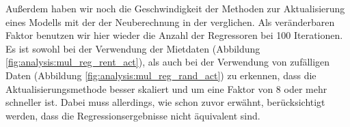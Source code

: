 Außerdem haben wir noch die Geschwindigkeit der Methoden zur Aktualisierung eines Modells mit der der Neuberechnung in der \naglib verglichen.
Als veränderbaren Faktor benutzen wir hier wieder die Anzahl der Regressoren bei 100 Iterationen.
Es ist sowohl bei der Verwendung der Mietdaten (Abbildung \ref{fig:analysis:mul_reg_rent_act}), als auch bei der Verwendung von zufälligen Daten (Abbildung \ref{fig:analysis:mul_reg_rand_act}) zu erkennen, dass die Aktualisierungsmethode besser skaliert und um eine Faktor von 8 oder mehr schneller ist.
Dabei muss allerdings, wie schon zuvor erwähnt, berücksichtigt werden, dass die Regressionsergebnisse nicht äquivalent sind.



